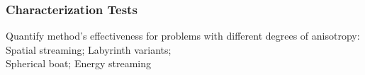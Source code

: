 \documentclass[handout]{beamer}
\renewcommand{\(}{\begin{columns}}
\renewcommand{\)}{\end{columns}}
\newcommand{\<}[1]{\begin{column}{#1}}
\renewcommand{\>}{\end{column}}
\begin{document}
\begin{frame}[fragile]

  \frametitle{Characterization Tests}
   Quantify method's effectiveness for problems with different degrees of anisotropy: \\
   \vspace*{1 em}
    Spatial streaming; \hspace*{2 em} Labyrinth variants;\\
    Spherical boat; \hspace*{4.25 em} Energy streaming
    \vspace{1 em}
    
%    

\end{frame}

\end{document}
